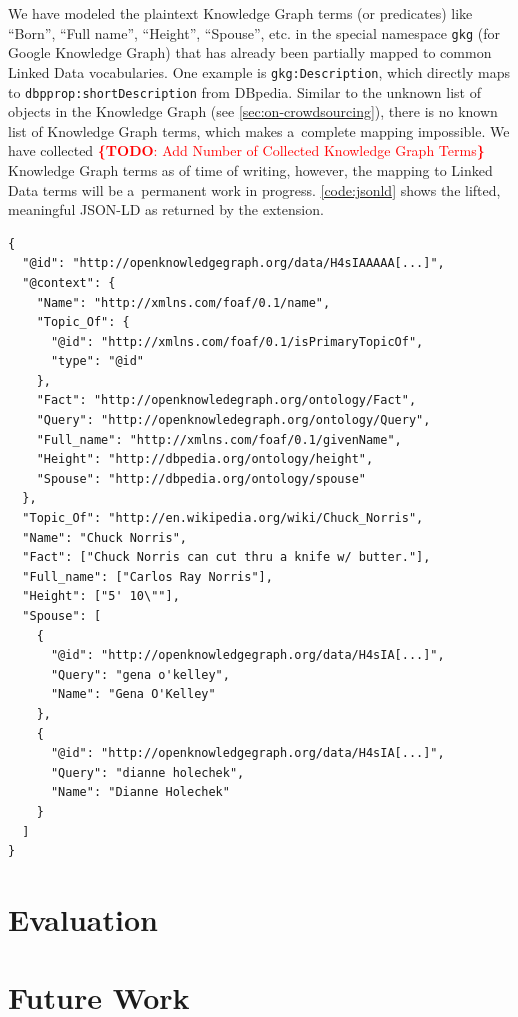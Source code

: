 \documentclass[runningheads,a4paper]{llncs}
\newcommand{\todo}[1]{\noindent\textcolor{red}{{\bf \{TODO}: #1{\bf \}}}}
\begin{document}
We have modeled the plaintext Knowledge Graph terms (or predicates)
like ``Born'', ``Full name'', ``Height'', ``Spouse'', etc.
in the special namespace \texttt{gkg} (for Google Knowledge Graph)
that has already been partially mapped to common Linked Data vocabularies.
One example is \texttt{gkg:Description},
which directly maps to \texttt{dbpprop:shortDescription} from DBpedia.
Similar to the unknown list of objects in the Knowledge Graph (see \autoref{sec:on-crowdsourcing}),
there is no known list of Knowledge Graph terms,
which makes a~complete mapping impossible.
We have collected \todo{Add Number of Collected Knowledge Graph Terms} Knowledge Graph terms
as of time of writing, however, the mapping to Linked Data terms
will be a~permanent work in progress.
\autoref{code:jsonld} shows the lifted, meaningful JSON-LD as returned by the extension.

\begin{lstlisting}[caption=Subset of the meaningful JSON-LD from the Chuck Norris Knowledge Graph data. The mapping of the Knowledge Graph terms can be seen in the @context., label=code:jsonld, float=bth!, escapechar=§]
{
  "@id": "http://openknowledgegraph.org/data/H4sIAAAAA[...]",
  "@context": {
    "Name": "http://xmlns.com/foaf/0.1/name",
    "Topic_Of": {
      "@id": "http://xmlns.com/foaf/0.1/isPrimaryTopicOf",
      "type": "@id"
    },
    "Fact": "http://openknowledegraph.org/ontology/Fact",
    "Query": "http://openknowledegraph.org/ontology/Query",
    "Full_name": "http://xmlns.com/foaf/0.1/givenName",
    "Height": "http://dbpedia.org/ontology/height",
    "Spouse": "http://dbpedia.org/ontology/spouse"
  },
  "Topic_Of": "http://en.wikipedia.org/wiki/Chuck_Norris",
  "Name": "Chuck Norris",
  "Fact": ["Chuck Norris can cut thru a knife w/ butter."],
  "Full_name": ["Carlos Ray Norris"],
  "Height": ["5' 10\""],
  "Spouse": [
    {
      "@id": "http://openknowledgegraph.org/data/H4sIA[...]",
      "Query": "gena o'kelley",
      "Name": "Gena O'Kelley"
    },
    {
      "@id": "http://openknowledgegraph.org/data/H4sIA[...]",
      "Query": "dianne holechek",
      "Name": "Dianne Holechek"
    }
  ]
}
\end{lstlisting} 

\section{Evaluation}

\section{Future Work}
\end{document}
